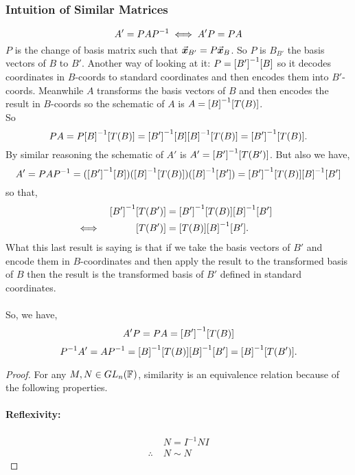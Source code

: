 \documentclass[MathsNotesBase.tex]{subfiles}
\begin{document}
{		\medskip
		\subsubsection{Intuition of Similar Matrices}
		\[ A' = PA{P}^{-1} \iff A'P = PA \]
		$P$ is the change of basis matrix such that ${ \vec{\bm{x}}_{B'} = P\vec{\bm{x}}_B }$. So $P$ is $B_{B'}$ the basis vectors of $B$ \wrt to $B'$. Another way of looking at it: ${ P = {[B']}^{-1}[B] }$ so it decodes coordinates in $B$-coords to standard coordinates and then encodes them into $B'$-coords. Meanwhile $A$ transforms the basis vectors of $B$ and then encodes the result in $B$-coords so the schematic of $A$ is ${ A = {[B]}^{-1}[T(B)] }$.\\
		So 
		\[ PA = P{[B]}^{-1}[T(B)] = {[B']}^{-1}[B]{[B]}^{-1}[T(B)] = {[B']}^{-1}[T(B)]. \]
		By similar reasoning the schematic of $A'$ is ${ A' = {[B']}^{-1}[T(B')] }$. But also we have,
		\[ A' = PA{P}^{-1} = ({[B']}^{-1}[B])({[B]}^{-1}[T(B)])({[B]}^{-1}[B']) = {[B']}^{-1}[T(B)]{[B]}^{-1}[B'] \]
		so that,
		\begin{align*}
		&& {[B']}^{-1}[T(B')] &= {[B']}^{-1}[T(B)]{[B]}^{-1}[B'] \\
		&\iff & [T(B')] &= [T(B)]{[B]}^{-1}[B']. &\text{\scriptsize{}} \\
		\end{align*}
		What this last result is saying is that if we take the basis vectors of $B'$ and encode them in $B$-coordinates and then apply the result to the transformed basis of $B$ then the result is the transformed basis of $B'$ defined in standard coordinates.\\\\
		So, we have,
		\[ A'P = PA = {[B']}^{-1}[T(B)] \]
		\[ {P}^{-1}A' = A{P}^{-1} = {[B]}^{-1}[T(B)]{[B]}^{-1}[B'] = {[B]}^{-1}[T(B')]. \]
		
		\bigskip
		\begin{proof}
			For any ${ M,N \in GL_n(\mathbb{F}^{}) }$, similarity is an equivalence relation because of the following properties.
			
			\paragraph{\small{Reflexivity:}}
			\begin{align*}
			& N = I^{-1}NI \\
			\therefore \; & N \sim N
			\end{align*}
			

\end{proof}}
\end{document}
